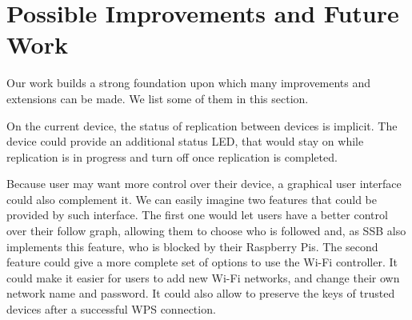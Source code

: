 \documentclass[a4paper,11pt,oneside]{report}
\begin{document}
\section{Possible Improvements and Future Work}

Our work builds a strong foundation upon which many improvements and extensions can be made. We list some of them in this section.

On the current device, the status of replication between devices is implicit. The device could provide an additional status LED, that would stay on while replication is in progress and turn off once replication is completed.

Because user may want more control over their device, a graphical user interface could also complement it. We can easily imagine two features that could be provided by such interface. The first one would let users have a better control over their follow graph, allowing them to choose who is followed and, as SSB also implements this feature, who is blocked by their Raspberry Pis. The second feature could give a more complete set of options to use the Wi-Fi controller. It could make it easier for users to add new Wi-Fi networks, and change their own network name and password. It could also allow to preserve the keys of trusted devices after a successful WPS connection.


\cleardoublepage
{}
{}
\printbibliography
\end{document}
